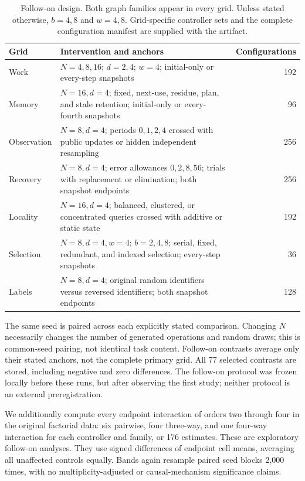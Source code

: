 \documentclass[sigconf,nonacm]{acmart}
\begin{document}
\begin{table}[t]
\centering\small
\begin{tabular}{lp{}r}
\toprule
Grid & Intervention and anchors & Configurations\\
\midrule
Work & $N=4,8,16$; $d=2,4$; $w=4$; initial-only or every-step snapshots & 192\\
Memory & $N=16,d=4$; fixed, next-use, residue, plan, and stale retention;
initial-only or every-fourth snapshots & 96\\
Observation & $N=8,d=4$; periods $0,1,2,4$ crossed with public updates
or hidden independent resampling & 256\\
Recovery & $N=8,d=4$; error allowances $0,2,8,56$; trials with replacement
or elimination; both snapshot endpoints & 256\\
Locality & $N=16,d=4$; balanced, clustered, or concentrated queries
crossed with additive or static state & 192\\
Selection & $N=8,d=4,w=4$; $b=2,4,8$; serial, fixed, redundant,
and indexed selection; every-step snapshots & 36\\
Labels & $N=8,d=4$; original random identifiers versus reversed identifiers;
both snapshot endpoints & 128\\
\bottomrule
\end{tabular}
\caption{Follow-on design. Both graph families appear in every grid.
Unless stated otherwise, $b=4,8$ and $w=4,8$. Grid-specific controller
sets and the complete configuration manifest are supplied with the artifact.}
\label{tab:ablationdesign}
\end{table}

The same seed is paired across each explicitly stated comparison.
Changing $N$ necessarily changes the number of generated operations and
random draws; this is common-seed pairing, not identical task content.
Follow-on contrasts average only their stated anchors, not the complete
primary grid. All 77 selected contrasts are stored, including negative
and zero differences. The follow-on protocol was frozen locally before
these runs, but after observing the first study; neither protocol is an
external preregistration.

We additionally compute every endpoint interaction of orders two through
four in the original factorial data: six pairwise, four three-way, and
one four-way interaction for each controller and family, or 176 estimates.
These are exploratory follow-on analyses. They use signed differences
of endpoint cell means, averaging all unaffected controls equally.
Bands again resample paired seed blocks 2,000 times, with no
multiplicity-adjusted or causal-mechanism significance claims.
\end{document}
